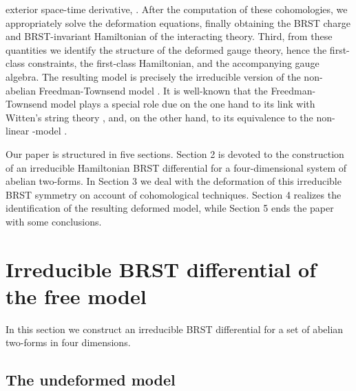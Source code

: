 \documentclass[a4paper,12pt]{article}
\begin{document}
exterior space-time derivative, \coordHE{}. After the
computation of these cohomologies, we appropriately solve the deformation
equations, finally obtaining the BRST charge and BRST-invariant Hamiltonian
of the interacting theory. Third, from these quantities we identify the
structure of the deformed gauge theory, hence the first-class constraints,
the first-class Hamiltonian, and the accompanying gauge algebra. The
resulting model is precisely the irreducible version of the non-abelian
Freedman-Townsend model \cite{29}. It is well-known that the
Freedman-Townsend model plays a special role due on the one hand to its link
with Witten's string theory \cite{30}, and, on the other hand, to its
equivalence to the non-linear \myHighlight{$\sigma $}\coordHE{}-model \cite{29}.

Our paper is structured in five sections. Section 2 is devoted to the
construction of an irreducible Hamiltonian BRST differential for a
four-dimensional system of abelian two-forms. In Section 3 we deal with the
deformation of this irreducible BRST symmetry on account of cohomological
techniques. Section 4 realizes the identification of the resulting deformed
model, while Section 5 ends the paper with some conclusions.

\section{Irreducible BRST differential of the free model}

In this section we construct an irreducible BRST differential for a set of
abelian two-forms in four dimensions.

\subsection{The undeformed model}
\end{document}
